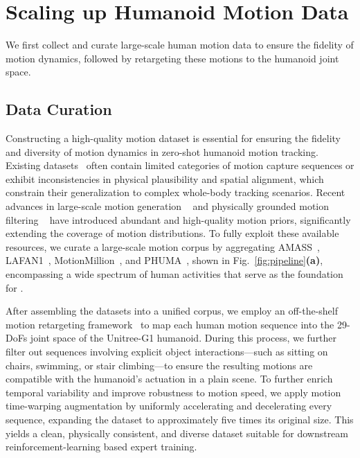 \section{Scaling up Humanoid Motion Data}
\label{sec:methods}

We first collect and curate large-scale human motion data to ensure the fidelity of motion dynamics, followed by retargeting these motions to the humanoid joint space.

\subsection{Data Curation}
\label{subsec:method_data}
Constructing a high-quality motion dataset is essential for ensuring the fidelity and diversity of motion dynamics in zero-shot humanoid motion tracking. Existing datasets~\cite{amass19, lafan20, motionx23, humanoidx24} often contain limited categories of motion capture sequences or exhibit inconsistencies in physical plausibility and spatial alignment, which constrain their generalization to complex whole-body tracking scenarios. Recent advances in large-scale motion generation ~\cite{motionmillion25} and physically grounded motion filtering ~\cite{phuma25} have introduced abundant and high-quality motion priors, significantly extending the coverage of motion distributions. To fully exploit these available resources, we curate a large-scale motion corpus by aggregating AMASS~\cite{amass19}, LAFAN1~\cite{lafan20}, MotionMillion~\cite{motionmillion25}, and PHUMA~\cite{phuma25}, shown in Fig.~\ref{fig:pipeline}\textbf{(a)}, encompassing a wide spectrum of human activities that serve as the foundation for \methodname.

After assembling the datasets into a unified corpus, we employ an off-the-shelf motion retargeting framework~\cite{gmr25} to map each human motion sequence into the 29-DoFs joint space of the Unitree-G1 humanoid. During this process, we further filter out sequences involving explicit object interactions—such as sitting on chairs, swimming, or stair climbing—to ensure the resulting motions are compatible with the humanoid’s actuation in a plain scene. To further enrich temporal variability and improve robustness to motion speed, we apply motion time-warping augmentation by uniformly accelerating and decelerating every sequence, expanding the dataset to approximately five times its original size. This yields a clean, physically consistent, and diverse dataset suitable for downstream reinforcement-learning based expert training.


